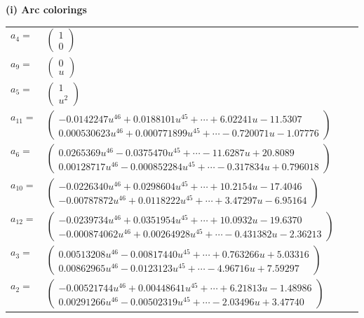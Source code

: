\documentclass[1p]{elsarticle_modified}
\theoremstyle{definition}
\begin{document}
\flushleft \textbf{(i) Arc colorings}\\
\begin{tabular}{m{7pt} m{180pt} m{7pt} m{180pt} }
\flushright $a_{4}=$&$\begin{pmatrix}1\\0\end{pmatrix}$ \\
\flushright $a_{9}=$&$\begin{pmatrix}0\\u\end{pmatrix}$ \\
\flushright $a_{5}=$&$\begin{pmatrix}1\\u^2\end{pmatrix}$ \\
\flushright $a_{11}=$&$\begin{pmatrix}-0.0142247 u^{46}+0.0188101 u^{45}+\cdots+6.02241 u-11.5307\\0.000530623 u^{46}+0.000771899 u^{45}+\cdots-0.720071 u-1.07776\end{pmatrix}$ \\
\flushright $a_{6}=$&$\begin{pmatrix}0.0265369 u^{46}-0.0375470 u^{45}+\cdots-11.6287 u+20.8089\\0.00128717 u^{46}-0.000852284 u^{45}+\cdots-0.317834 u+0.796018\end{pmatrix}$ \\
\flushright $a_{10}=$&$\begin{pmatrix}-0.0226340 u^{46}+0.0298604 u^{45}+\cdots+10.2154 u-17.4046\\-0.00787872 u^{46}+0.0118222 u^{45}+\cdots+3.47297 u-6.95164\end{pmatrix}$ \\
\flushright $a_{12}=$&$\begin{pmatrix}-0.0239734 u^{46}+0.0351954 u^{45}+\cdots+10.0932 u-19.6370\\-0.000874062 u^{46}+0.00264928 u^{45}+\cdots-0.431382 u-2.36213\end{pmatrix}$ \\
\flushright $a_{3}=$&$\begin{pmatrix}0.00513208 u^{46}-0.00817440 u^{45}+\cdots+0.763266 u+5.03316\\0.00862965 u^{46}-0.0123123 u^{45}+\cdots-4.96716 u+7.59297\end{pmatrix}$ \\
\flushright $a_{2}=$&$\begin{pmatrix}-0.00521744 u^{46}+0.00448641 u^{45}+\cdots+6.21813 u-1.48986\\0.00291266 u^{46}-0.00502319 u^{45}+\cdots-2.03496 u+3.47740\end{pmatrix}$ \\

\end{tabular}
\end{document}
